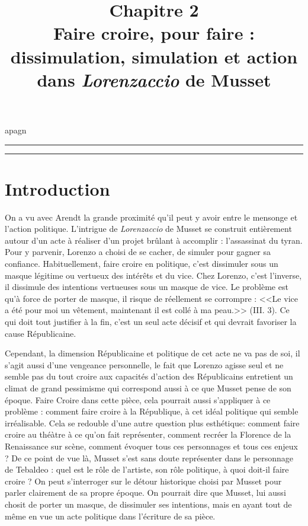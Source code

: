 \documentclass[12pt]{article}
\title{Chapitre 2\\\large Faire croire, pour faire : dissimulation, simulation et action dans \emph{Lorenzaccio} de Musset}
\date{}
\author{}
\begin{document}
\maketitle
\thispagestyle{fancy}
\begin{center}
    \LARGE{apagn}
\end{center}
\hrule
\tableofcontents
\hrule
{}
\pagebreak
\section*{\color{red}Introduction}
On a vu avec Arendt la grande proximité qu'il peut y avoir entre le mensonge et l'action politique.
L'intrigue de \emph{Lorenzaccio} de Musset se construit entièrement autour d'un acte à réaliser d'un projet brûlant à accomplir : l'assassinat du tyran.
Pour y parvenir, Lorenzo a choisi de se cacher, de simuler pour gagner sa confiance.
Habituellement, faire croire en politique, c'est dissimuler sous un masque légitime ou vertueux des intérêts et du vice.
Chez Lorenzo, c'est l'inverse, il dissimule des intentions vertueuses sous un masque de vice.
Le problème est qu'à force de porter de masque, il risque de réellement se corrompre : <<Le vice a été pour moi un vêtement, maintenant il est collé à ma peau.>> (III. 3).
Ce qui doit tout justifier à la fin, c'est un seul acte décisif et qui devrait favoriser la cause Républicaine.

Cependant, la dimension Républicaine et politique de cet acte ne va pas de soi, il s'agit aussi d'une vengeance personnelle, le fait que Lorenzo agisse seul et ne semble pas du tout croire aux capacités d'action des Républicains entretient un climat de grand pessimisme qui correspond aussi à ce que Musset pense de son époque.
Faire Croire dans cette pièce, cela pourrait aussi s'appliquer à ce problème : comment faire croire à la République, à cet idéal politique qui semble irréalisable.
Cela se redouble d'une autre question plus esthétique: comment faire croire au théàtre à ce qu'on fait représenter, comment recréer la Florence de la Renaissance sur scène, comment évoquer tous ces personnages et tous ces enjeux ?
De ce point de vue là, Musset s'est sans doute représenter dans le personnage de Tebaldeo : quel est le rôle de l'artiste, son rôle politique, à quoi doit-il faire croire ?
On peut s'interroger sur le détour historique choisi par Musset pour parler clairement de sa propre époque.
On pourrait dire que Musset, lui aussi chosit de porter un masque, de dissimuler ses intentions, mais en ayant tout de même en vue un acte politique dans l'écriture de sa pièce.
\end{document}
